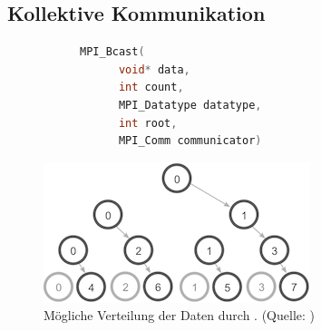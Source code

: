       
    \subsection{Kollektive Kommunikation}
    \label{sek:kolkom}
    
    \begin{center}
      \begin{figure}[b]
      \centering
      \begin{subfigure}{0.9\textwidth}
      \begin{lstlisting}[language=C, label=lst:bcast, caption={Die Syntax von \code{MPI\_Bcast}}, numbers=none]
	MPI_Bcast(
	  void* data,
	  int count,
	  MPI_Datatype datatype,
	  int root,
	  MPI_Comm communicator)
      \end{lstlisting}
      \end{subfigure}
      \end{figure}
      
      \begin{figure}[b]
	\includegraphics{img/bcast_tree_gray.png}
	\caption{Mögliche Verteilung der Daten durch . (Quelle: \citet{mpitut})}
	\label{fig:bcast_tree}
      \end{figure}
      \end{center}
      
